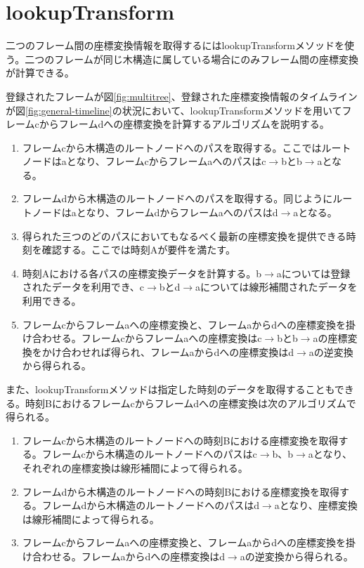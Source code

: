 \documentclass[a4paper]{jreport}	%
\begin{document}
\section{lookupTransform}
二つのフレーム間の座標変換情報を取得するにはlookupTransformメソッドを使う。二つのフレームが同じ木構造に属している場合にのみフレーム間の座標変換が計算できる。


登録されたフレームが図\ref{fig:multitree}、登録された座標変換情報のタイムラインが図\ref{fig:general-timeline}の状況において、lookupTransformメソッドを用いてフレームcからフレームdへの座標変換を計算するアルゴリズムを説明する。

\begin{enumerate}
	\item フレームcから木構造のルートノードへのパスを取得する。ここではルートノードはaとなり、フレームcからフレームaへのパスはc$\rightarrow$bとb$\rightarrow$aとなる。
	\item フレームdから木構造のルートノードへのパスを取得する。同じようにルートノードはaとなり、フレームdからフレームaへのパスはd$\rightarrow$aとなる。
	\item 得られた三つのどのパスにおいてもなるべく最新の座標変換を提供できる時刻を確認する。ここでは時刻Aが要件を満たす。
	\item 時刻Aにおける各パスの座標変換データを計算する。b$\rightarrow$aについては登録されたデータを利用でき、c$\rightarrow$bとd$\rightarrow$aについては線形補間されたデータを利用できる。
	\item フレームcからフレームaへの座標変換と、フレームaからdへの座標変換を掛け合わせる。フレームcからフレームaへの座標変換はc$\rightarrow$bとb$\rightarrow$aの座標変換をかけ合わせれば得られ、フレームaからdへの座標変換はd$\rightarrow$aの逆変換から得られる。
\end{enumerate}
また、lookupTransformメソッドは指定した時刻のデータを取得することもできる。時刻Bにおけるフレームcからフレームdへの座標変換は次のアルゴリズムで得られる。

\begin{enumerate}
	\item フレームcから木構造のルートノードへの時刻Bにおける座標変換を取得する。フレームcから木構造のルートノードへのパスはc$\rightarrow$b、b$\rightarrow$aとなり、それぞれの座標変換は線形補間によって得られる。
	\item フレームdから木構造のルートノードへの時刻Bにおける座標変換を取得する。フレームdから木構造のルートノードへのパスはd$\rightarrow$aとなり、座標変換は線形補間によって得られる。
	\item フレームcからフレームaへの座標変換と、フレームaからdへの座標変換を掛け合わせる。フレームaからdへの座標変換はd$\rightarrow$aの逆変換から得られる。
\end{enumerate}
\end{document}
